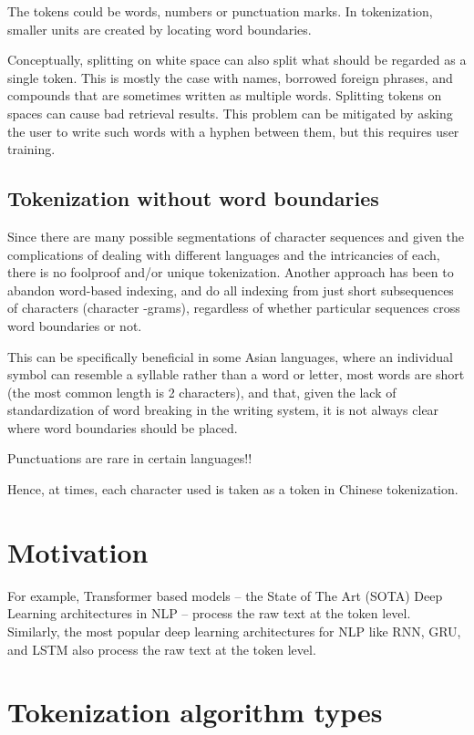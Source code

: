 The tokens could be words, numbers or punctuation marks. In tokenization, smaller units are created by locating word boundaries.

Conceptually, splitting on white space can also split what should be regarded as a single token. This is mostly the case with names, borrowed foreign phrases, and compounds that are sometimes written as multiple words. Splitting tokens on spaces can cause bad retrieval results. This problem can be mitigated by asking the user to write such words with a hyphen between them, but this requires user training.

\subsection{Tokenization without word boundaries}

Since there are many possible segmentations of character sequences and given the complications of dealing with different languages and the intricancies of each, there is no foolproof and/or unique tokenization. Another approach has been to abandon word-based indexing, and do all indexing from just short subsequences of characters (character -grams), regardless of whether particular sequences cross word boundaries or not.

This can be specifically beneficial in some Asian languages, where an individual symbol can resemble a syllable rather than a word or letter,  most words are short (the most common length is 2 characters), and that, given the lack of standardization of word breaking in the writing system, it is not always clear where word boundaries should be placed.

Punctuations are rare in certain languages!!

Hence, at times, each character used is taken as a token in Chinese tokenization.

\section{Motivation}

For example, Transformer based models – the State of The Art (SOTA) Deep Learning architectures in NLP – process the raw text at the token level. Similarly, the most popular deep learning architectures for NLP like RNN, GRU, and LSTM also process the raw text at the token level.


\section{Tokenization algorithm types}

